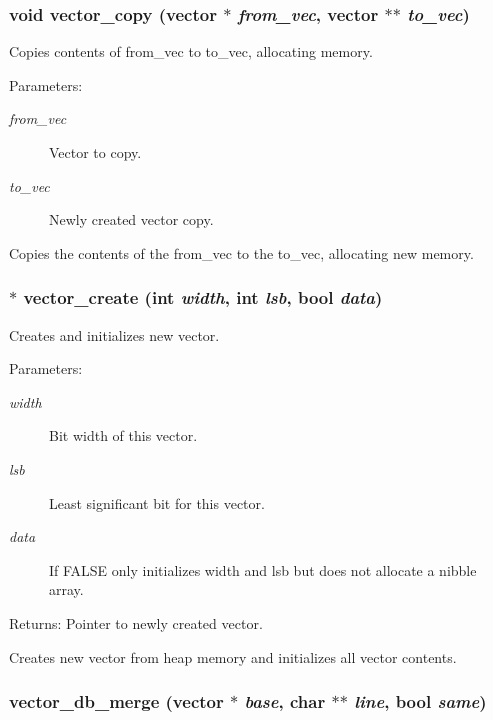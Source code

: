 \subsubsection{\setlength{\rightskip}{0pt plus 5cm}void vector\_\-copy ({\bf vector} $\ast$ {\em from\_\-vec}, {\bf vector} $\ast$$\ast$ {\em to\_\-vec})}\label{vector_8c_a10}


Copies contents of from\_\-vec to to\_\-vec, allocating memory. 

\begin{Desc}
\item[Parameters:]
\begin{description}
\item[{\em from\_\-vec}]Vector to copy. \item[{\em to\_\-vec}]Newly created vector copy.\end{description}
\end{Desc}
Copies the contents of the from\_\-vec to the to\_\-vec, allocating new memory. 
\subsubsection{$\ast$ vector\_\-create (int {\em width}, int {\em lsb}, {\bf bool} {\em data})}\label{vector_8c_a9}


Creates and initializes new vector. 

\begin{Desc}
\item[Parameters:]
\begin{description}
\item[{\em width}]Bit width of this vector. \item[{\em lsb}]Least significant bit for this vector. \item[{\em data}]If FALSE only initializes width and lsb but does not allocate a nibble array.\end{description}
\end{Desc}
\begin{Desc}
\item[Returns:]Pointer to newly created vector.\end{Desc}
Creates new vector from heap memory and initializes all vector contents. 
\subsubsection{ vector\_\-db\_\-merge ({\bf vector} $\ast$ {\em base}, char $\ast$$\ast$ {\em line}, {\bf bool} {\em same})}\label{vector_8c_a13}


